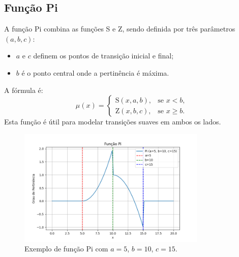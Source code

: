 \documentclass[a4paper,12pt]{article}
\begin{document}
\subsection{Função Pi}
A função Pi combina as funções S e Z, sendo definida por três parâmetros $(a, b, c)$:
\begin{itemize}
    \item $a$ e $c$ definem os pontos de transição inicial e final;
    \item $b$ é o ponto central onde a pertinência é máxima.
\end{itemize}
A fórmula é:
\[
\mu(x) =
\begin{cases}
\text{S}(x, a, b), & \text{se } x < b, \\
\text{Z}(x, b, c), & \text{se } x \geq b.
\end{cases}
\]
Esta função é útil para modelar transições suaves em ambos os lados.
\begin{figure}[H]
    \centering
    \includegraphics[width=0.8\textwidth]{img/pi.png}
    \caption{Exemplo de função Pi com $a=5$, $b=10$, $c=15$.}
\end{figure}
\end{document}

